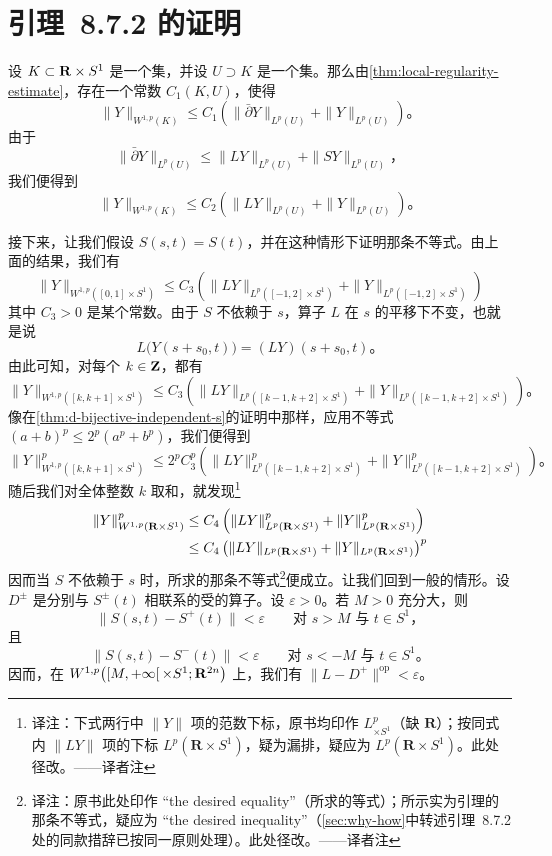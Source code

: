 
\section{引理~8.7.2 的证明}
\label{sec:proof-lemma-872}

设 $K\subset\mathbf{R}\times S^{1}$ 是一个\trCompact{}集，并设 $U\supset K$ 是一个\trOpen{}集。那么由\cref{thm:local-regularity-estimate}，存在一个常数 $C_{1}(K,U)$，使得
\[
\|Y\|_{W^{1,p}(K)}\le C_{1}\left(\|\bar{\partial}Y\|_{L^{p}(U)}+\|Y\|_{L^{p}(U)}\right)\text{。}
\]
由于
\[
\|\bar{\partial}Y\|_{L^{p}(U)}\le\|LY\|_{L^{p}(U)}+\|SY\|_{L^{p}(U)}\text{，}
\]
我们便得到
\[
\|Y\|_{W^{1,p}(K)}\le C_{2}\left(\|LY\|_{L^{p}(U)}+\|Y\|_{L^{p}(U)}\right)\text{。}
\]

接下来，让我们假设 $S(s,t)=S(t)$，并在这种情形下证明那条不等式。由上面的结果，我们有
\[
\|Y\|_{W^{1,p}([0,1]\times S^{1})}\le C_{3}\left(\|LY\|_{L^{p}([-1,2]\times S^{1})}+\|Y\|_{L^{p}([-1,2]\times S^{1})}\right)
\]
其中 $C_{3}>0$ 是某个常数。由于 $S$ 不依赖于 $s$，算子 $L$ 在 $s$ 的平移下不变，也就是说
\[
L\bigl(Y(s+s_{0},t)\bigr)=(LY)(s+s_{0},t)\text{。}
\]
由此可知，对每个 $k\in\mathbf{Z}$，都有
\[
\|Y\|_{W^{1,p}([k,k+1]\times S^{1})}\le C_{3}\left(\|LY\|_{L^{p}([k-1,k+2]\times S^{1})}+\|Y\|_{L^{p}([k-1,k+2]\times S^{1})}\right)\text{。}
\]
像在\cref{thm:d-bijective-independent-s}的证明中那样，应用不等式 $(a+b)^{p}\le 2^{p}(a^{p}+b^{p})$，我们便得到
\[
\|Y\|^{p}_{W^{1,p}([k,k+1]\times S^{1})}\le 2^{p}C_{3}^{p}\left(\|LY\|^{p}_{L^{p}([k-1,k+2]\times S^{1})}+\|Y\|^{p}_{L^{p}([k-1,k+2]\times S^{1})}\right)\text{。}
\]
随后我们对全体整数 $k$ 取和，就发现\footnote{译注：下式两行中 $\|Y\|$ 项的范数下标，原书均印作 $L^{p}_{\times S^{1}}$（缺 $\mathbf{R}$）；按同式内 $\|LY\|$ 项的下标 $L^{p}(\mathbf{R}\times S^{1})$，疑为漏排，疑应为 $L^{p}(\mathbf{R}\times S^{1})$。此处径改。——译者注}
\[
\begin{aligned}
\|Y\|^{p}_{W^{1,p}(\mathbf{R}\times S^{1})}&\le C_{4}\left(\|LY\|^{p}_{L^{p}(\mathbf{R}\times S^{1})}+\|Y\|^{p}_{L^{p}(\mathbf{R}\times S^{1})}\right)\\
&\le C_{4}\left(\|LY\|_{L^{p}(\mathbf{R}\times S^{1})}+\|Y\|_{L^{p}(\mathbf{R}\times S^{1})}\right)^{p}
\end{aligned}
\]
因而当 $S$ 不依赖于 $s$ 时，所求的那条不等式\footnote{译注：原书此处印作 “the desired equality”（所求的等式）；所示实为引理的那条不等式，疑应为 “the desired inequality”（\cref{sec:why-how}中转述引理~8.7.2 处的同款措辞已按同一原则处理）。此处径改。——译者注}便成立。让我们回到一般的情形。设 $D^{\pm}$ 是分别与 $S^{\pm}(t)$ 相联系的受\trPerturbation{}的\trCauchyRiemann{}算子。设 $\varepsilon>0$。若 $M>0$ 充分大，则
\[
\|S(s,t)-S^{+}(t)\|<\varepsilon\qquad\text{对 }s>M\text{ 与 }t\in S^{1}\text{，}
\]
且
\[
\|S(s,t)-S^{-}(t)\|<\varepsilon\qquad\text{对 }s<-M\text{ 与 }t\in S^{1}\text{。}
\]
因而，在 $W^{1,p}\bigl([M,+\infty[\,\times S^{1};\mathbf{R}^{2n}\bigr)$ 上，我们有 $\|L-D^{+}\|^{\mathrm{op}}<\varepsilon$。

